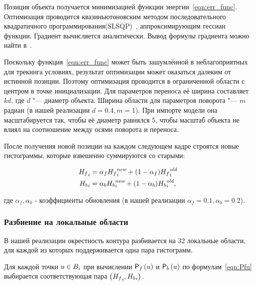 Позиция объекта получается минимизацией функции энергии~\ref{eqn:err_func}.
Оптимизация проводится квазиньютоновским методом последовательного
квадратичного
программирования(SLSQP)~\cite{SLSQP}, аппроксимирующим гессиан функции.
Градиент вычисляется аналитически.
Вывод формулы градиента можно найти в~\cite{Tjaden2018}.

Поскольку функция~\ref{eqn:err_func} может быть зашумлённой в неблагоприятных
для трекинга условиях, результат оптимизации может оказаться далеким от
истинной позиции.
Поэтому оптимизация проводится в ограниченной области с центром в точке
инициализации.
Для параметров переноса её ширина составляет $kd$, где $d$ "--- диаметр
объекта.
Ширина области для параметров поворота "--- $m$ радиан (в нашей реализации $d =
0.4, m = 1$).
При импорте модели она масштабируется так, чтобы её диаметр равнялся $5$,
чтобы масштаб объекта не влиял на соотношение между осями поворота и переноса.


После получения новой позиции на каждом следующем кадре строятся новые
гистограммы, которые взвешенно суммируются со старыми: 

\begin{align}
{\ensuremath{H_f}}_i &= \alpha_f {H_f}_i^{\text{\it new}} + (1 - \alpha_f)
{H_f}_i^{\text{\it old}} \\{H_b}_i &= \alpha_b
{H_b}_i^{\text{\it new}} + (1 - \alpha_b) {H_b}_i^{\text{\it
old}}\text{,}
\end{align}

где $\alpha_f, \alpha_b$ - коэффициенты обновления (в нашей реализации
$\alpha_f = 0.1, \alpha_b = 0.2$).


\subsubsection*{Разбиение на локальные области}

В нашей реализации окрестность контура разбивается на $32$ локальные области,
для
каждой из
которых поддерживается одна пара гистограмм.

Для каждой точки $\mathnormal{u} \in B_i$ при вычислении $\mathsf{P}_f \left( \mathnormal{u} \right)$ и
$\mathsf{P}_b \left( \mathnormal{u} \right)$ по
формулам~\ref{eqn:Pfu} выбирается соответствующая пара $\left( {H_f}_i,
{H_b}_i \right)$.


